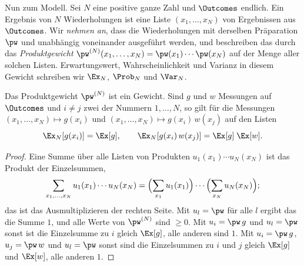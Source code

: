 \begin{vertiefung}
  Nun zum Modell. Sei $N$ eine positive ganze Zahl und $\Outcomes$ endlich. Ein Ergebnis
  von $N$ Wiederholungen ist eine Liste $(x_1, \dots, x_N)$
  von Ergebnissen aus $\Outcomes$. Wir \emph{nehmen an}, dass die Wiederholungen mit
  derselben Präparation $\pw$ und unabhängig voneinander ausgeführt werden, und
  beschreiben das durch das \emph{Produktgewicht}
  $\pw^{(N)}(x_1, \dots, x_N) = \pw(x_1)\cdots\pw(x_N)$ auf der Menge aller solchen Listen.
  Erwartungswert, Wahrscheinlichkeit und Varianz in diesem Gewicht schreiben wir $\Ex_N$,
  $\Prob_N$ und $\Var_N$.

  \begin{lemma}[Produktgewicht]\label{c01.lem.produkt}
    Das Produktgewicht $\pw^{(N)}$ ist ein Gewicht. Sind $g$ und $w$ Messungen auf
    $\Outcomes$ und $i \neq j$ zwei der Nummern $1, \dots, N$, so gilt für die Messungen
    $(x_1, \dots, x_N) \mapsto g(x_i)$ und $(x_1, \dots, x_N) \mapsto g(x_i)\,w(x_j)$ auf
    den Listen
    \begin{equation}\label{c01.eq.produkt}
      \Ex_N[g(x_i)] = \Ex[g],
      \qquad
      \Ex_N[g(x_i)\,w(x_j)] = \Ex[g]\;\Ex[w] .
    \end{equation}
  \end{lemma}
  \begin{proof}
    Eine Summe über alle Listen von Produkten $u_1(x_1)\cdots u_N(x_N)$ ist das Produkt der
    Einzelsummen,
    \begin{equation*}
      \sum_{x_1, \dots, x_N} u_1(x_1)\cdots u_N(x_N)
      = \Bigl(\sum_{x_1} u_1(x_1)\Bigr)\cdots\Bigl(\sum_{x_N} u_N(x_N)\Bigr) ;
    \end{equation*}
    das ist das Ausmultiplizieren der rechten Seite. Mit $u_l = \pw$ für alle $l$ ergibt das die Summe
    $1$, und alle Werte von $\pw^{(N)}$ sind $\geq 0$. Mit $u_i = \pw\, g$ und $u_l = \pw$
    sonst ist die Einzelsumme zu $i$ gleich $\Ex[g]$, alle anderen sind $1$. Mit
    $u_i = \pw\, g$, $u_j = \pw\, w$ und $u_l = \pw$ sonst sind die Einzelsummen zu $i$ und
    $j$ gleich $\Ex[g]$ und $\Ex[w]$, alle anderen $1$.
  \end{proof}


\end{vertiefung}
